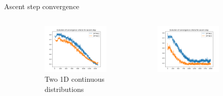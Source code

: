 \begin{frame}{Ascent step convergence}
    \begin{figure}
    \begin{columns}
        \begin{column}{.5\textwidth}
            \begin{subfigure}{\textwidth}
            \centering
            \includegraphics[width=\textwidth]{figures/ascent_criteria_msamples16000_iter0_1D_2skewnorm.png}
            \caption{Two 1D continuous distributions}
            \end{subfigure}
        \end{column}
        \begin{column}{.5\textwidth}
            \begin{subfigure}{\textwidth}
                \centering
                \includegraphics[width=\textwidth]{figures/ascent_criteria_msamples16000_iter0_2D_discrete.png}

\end{subfigure}
\end{column}
\end{columns}
\end{figure}
\end{frame}

